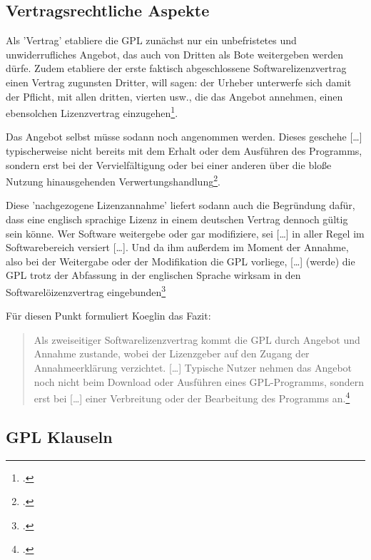\documentclass[DIV=calc,BCOR=5mm,11pt,headings=small,oneside,abstract=true, toc=bib]{scrartcl}
\begin{document}
\subsection{Vertragsrechtliche Aspekte}

Als 'Vertrag' etabliere die GPL zunächst nur \glqq{}ein unbefristetes und
unwiderrufliches Angebot\grqq{}, das auch von \glqq{}Dritten als Bote\grqq{}
weitergeben werden dürfe. Zudem etabliere der erste faktisch
\glqq{}abgeschlossene Softwarelizenzvertrag\grqq{} einen \glqq{}Vertrag
zugunsten Dritter\grqq{}, will sagen: der Urheber unterwerfe sich damit der
Pflicht, mit allen dritten, vierten usw., die das Angebot annehmen, einen
ebensolchen Lizenzvertrag einzugehen\footcite[vgl.][182]{Koglin2007a}.

Das Angebot selbst müsse sodann noch angenommen werden. Dieses geschehe
\glqq{}[\ldots] typischerweise nicht bereits mit dem Erhalt oder dem
Ausführen des Programms, sondern erst bei der Vervielfältigung oder bei
einer anderen über die bloße Nutzung hinausgehenden
Verwertungshandlung\grqq{}\footcite[vgl.][182]{Koglin2007a}.

Diese 'nachgezogene Lizenzannahme' liefert sodann auch die Begründung dafür,
dass eine englisch sprachige Lizenz in einem deutschen Vertrag dennoch gültig
sein könne. Wer Software weitergebe oder gar modifiziere, sei \glqq{}[\ldots]
in aller Regel im Softwarebereich versiert [\ldots]\grqq{}. Und da ihm
außerdem im Moment der Annahme, also bei der Weitergabe oder der Modifikation
die GPL vorliege, \glqq{}[\ldots] (werde) die GPL trotz der Abfassung in
der englischen Sprache wirksam in den Softwarelöizenzvertrag
eingebunden\grqq{}\footcite[vgl.][182f]{Koglin2007a}

Für diesen Punkt formuliert Koeglin das Fazit:

\begin{quote}\glqq{}Als zweiseitiger Softwarelizenzvertrag kommt die GPL
durch Angebot und Annahme zustande, wobei der Lizenzgeber auf den Zugang
der Annahmeerklärung verzichtet. [\ldots] Typische Nutzer nehmen das
Angebot noch nicht beim Download oder Ausführen eines GPL-Programms,
sondern erst bei [\ldots] einer Verbreitung oder der Bearbeitung des
Programms an.\grqq{}\footcite[][227]{Koglin2007a}
\end{quote}

\subsection{GPL Klauseln}
\end{document}
